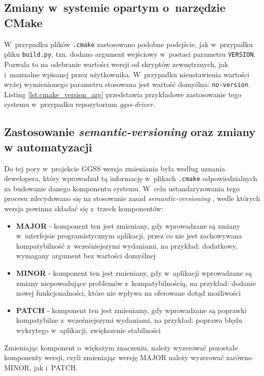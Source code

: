 \subsection{Zmiany w~systemie opartym o~narzędzie CMake}
W~przypadku plików \lstinline{.cmake} zastosowano podobne podejście, jak w~przypadku pliku \lstinline{build.py}, tzn. dodano argument wejściowy w~postaci parametru \lstinline{VERSION}. Pozwala to na odebranie wartości wersji od skryptów zewnętrznych, jak i~manualne wpisanej przez użytkownika. W~przypadku nieustawienia wartości wyżej wymienionego parametru stosowana jest wartość domyślna: \lstinline{no-version}. Listing \ref{lst:cmake_version_arg} przedstawia przykładowe zastosowanie tego systemu w~przypadku repozytorium \emph{ggss-driver}.

\clearpage



\subsection{Zastosowanie \emph{semantic-versioning} oraz zmiany w automatyzacji}
Do tej pory w~projekcie GGSS wersja zmieniania była według uznania dewelopera, który wprowadzał tą informację w~plikach \lstinline{.cmake} odpowiedzialnych za budowanie danego komponentu systemu. W~celu ustandaryzowania tego procesu zdecydowano się na stosowanie zasad \emph{semantic-versioning} \cite{semver}, wedle których wersja powinna składać się z~trzech komponentów:
\begin{itemize}
    \item \textbf{MAJOR} - komponent ten jest zmieniany, gdy wprowadzane są zmiany w~interfejsie programistycznym aplikacji, przez co nie jest zachowywana kompatybilność z~wcześniejszymi wydaniami, na przykład: dodatkowy, wymagany argument bez wartości domyślnej
    \item \textbf{MINOR} - komponent ten jest zmieniany, gdy w~aplikacji wprowadzane są zmiany niepowodujące problemów z~kompatybilnością, na przykład: dodanie nowej funkcjonalności, które nie wpływa na oferowane dotąd możliwości
    \item \textbf{PATCH} - komponent ten jest zmieniamy, gdy wprowadzane są poprawki kompatybilne z~wcześniejszymi wydaniami, na przykład: poprawa błędu wykrytego w~aplikacji, zwiększenie stabilności
\end{itemize}
Zmieniając komponent o~większym znaczeniu, należy wyzerować pozostałe komponenty wersji, czyli zmieniając wersję MAJOR należy wyzerować zarówno MINOR, jak i~PATCH.

